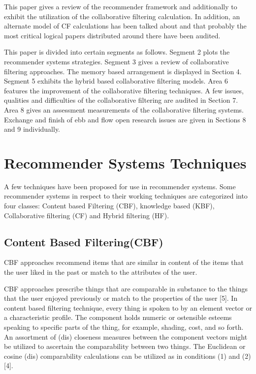 \documentclass[10pt,conference]{IEEEtran}
\begin{document}
This paper gives a review of the recommender framework and additionally to exhibit the utilization of the collaborative filtering calculation. In addition, an alternate model of CF calculations has been talked about and that probably the most critical logical papers distributed around there have been audited.

This paper is divided into certain segments as follows. Segment 2 plots the recommender systems strategies. Segment 3 gives a review of collaborative filtering approaches. The memory based arrangement is displayed in Section 4. Segment 5 exhibits the hybrid based collaborative filtering models. Area 6 features the improvement of the collaborative filtering techniques. A few issues, qualities and difficulties of the collaborative filtering are audited in Section 7. Area 8 gives an assessment measurements of the collaborative filtering systems. Exchange and finish of ebb and flow open research issues are given in Sections 8 and 9 individually.

\cite{su2009survey}
\cite{zuva2012survey}
\cite{herlocker2004evaluating}
\cite{linden2003amazon}
\cite{adomavicius2005toward}
\cite{park2012literature}


\section{Recommender Systems Techniques}
A few techniques have been proposed for use in recommender systems. Some recommender systems in respect to their working techniques are categorized into four classes: Content based Filtering (CBF), knowledge based (KBF), Collaborative filtering (CF) and Hybrid filtering (HF).

\subsection{Content Based Filtering(CBF)}
CBF approaches recommend items that are similar in content of the items that the user liked in the past or match to the attributes of the user.

CBF approaches prescribe things that are comparable in substance to the things that the user enjoyed previously or match to the properties of the user [5]. In content based filtering technique, every thing is spoken to by an element vector or a characteristic profile. The component holds numeric or ostensible esteems speaking to specific parts of the thing, for example, shading, cost, and so forth. An assortment of (dis) closeness measures between the component vectors might be utilized to ascertain the comparability between two things. The Euclidean or cosine (dis) comparability calculations can be utilized as in conditions (1) and (2) [4].
\end{document}
